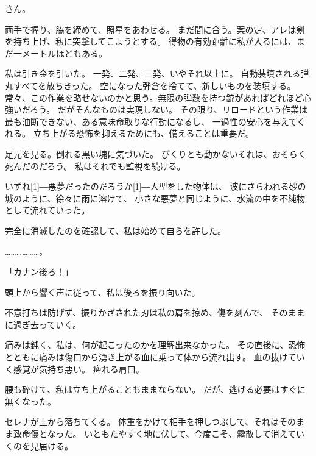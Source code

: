 \documentclass[../IHMain]{subfiles}
\begin{document}
さん。

両手で握り、脇を締めて、照星をあわせる。
まだ間に合う。案の定、アレは剣を持ち上げ、私に突撃してこようとする。
得物の有効距離に私が入るには、まだ一メートルほどもある。

私は引き金を引いた。
一発、二発、三発、いやそれ以上に。
自動装填される弾丸すべてを放ちきった。
空になった弾倉を捨てて、新しいものを装填する。
常々、この作業を略せないのかと思う。無限の弾数を持つ銃があればどれほど心強いだろう。
だがそんなものは実現しない。
その限り、リロードという作業は最も油断できない、ある意味命取りな行動になるし、
一過性の安心を与えてくれる。
立ち上がる恐怖を抑えるためにも、備えることは重要だ。

足元を見る。倒れる黒い塊に気づいた。
ぴくりとも動かないそれは、おそらく死んだのだろう。
私はそれでも監視を続ける。

いずれ\scalebox{3}[1]{―}悪夢だったのだろうか\scalebox{3}[1]{―}人型をした物体は、
波にさらわれる砂の城のように、徐々に雨に溶けて、
小さな悪夢と同じように、水流の中を不純物として流れていった。

完全に消滅したのを確認して、私は始めて自らを許した。

………………。

「カナン後ろ！」

頭上から響く声に従って、私は後ろを振り向いた。

不意打ちは防げず、振りかざされた刃は私の肩を掠め、傷を刻んで、
そのままに過ぎ去っていく。

痛みは鈍く、私は、何が起こったのかを理解出来なかった。
その直後に、恐怖とともに痛みは傷口から湧き上がる血に乗って体から流れ出す。
血の抜けていく感覚が気持ち悪い。
痺れる肩口。

腰も砕けて、私は立ち上がることもままならない。
だが、逃げる必要はすぐに無くなった。

セレナが上から落ちてくる。
体重をかけて相手を押しつぶして、それはそのまま致命傷となった。
いともたやすく地に伏して、今度こそ、霧散して消えていくのを見届ける。
\end{document}
